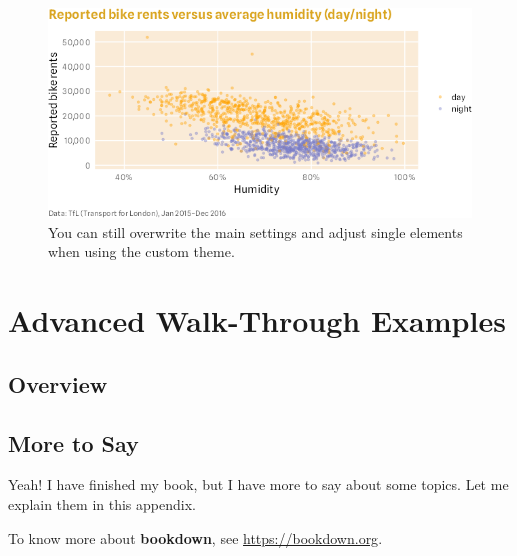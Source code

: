 \documentclass[
]{krantz}
\begin{document}
\begin{figure}
\centering
\includegraphics{bookdown_files/figure-latex/06customThemeModified-1.png}
\caption{\label{fig:06customThemeModified}You can still overwrite the main settings and adjust single elements when using the custom theme.}
\end{figure}

\hypertarget{part-advanced-walk-through-examples}{%
\part{Advanced Walk-Through Examples}\label{part-advanced-walk-through-examples}}

\hypertarget{advanced-examples}{%
\chapter{Overview}\label{advanced-examples}}

\cleardoublepage

\hypertarget{appendix-appendix}{%
\appendix {}}


\hypertarget{more-to-say}{%
\chapter{More to Say}\label{more-to-say}}

Yeah! I have finished my book, but I have more to say about some topics. Let me explain them in this appendix.

To know more about \textbf{bookdown}, see \url{https://bookdown.org}.

  

\backmatter
\printindex
\end{document}
